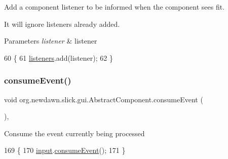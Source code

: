 Add a component listener to be informed when the component sees fit.

It will ignore listeners already added.


\begin{DoxyParams}{Parameters}
{\em listener} & listener \\
\hline
\end{DoxyParams}

\begin{DoxyCode}
60                                                         \{
61         \mbox{\hyperlink{classorg_1_1newdawn_1_1slick_1_1gui_1_1_abstract_component_a7cec595b9b830ed15376739af35a1492}{listeners}}.add(listener);
62     \}
\end{DoxyCode}
\mbox{\label{classorg_1_1newdawn_1_1slick_1_1gui_1_1_abstract_component_a76fb8b7de47e5ed6129010ad3d6e748d}} 
\subsubsection{\texorpdfstring{consume\+Event()}{consumeEvent()}}
{\footnotesize\ttfamily void org.\+newdawn.\+slick.\+gui.\+Abstract\+Component.\+consume\+Event (\begin{DoxyParamCaption}{ }\end{DoxyParamCaption})\hspace{0.3cm}{\ttfamily [inline]}, {\ttfamily [protected]}}

Consume the event currently being processed 
\begin{DoxyCode}
169                                   \{
170         \mbox{\hyperlink{classorg_1_1newdawn_1_1slick_1_1gui_1_1_abstract_component_a06d7d458d50451485923e23c7d9d2b60}{input}}.\mbox{\hyperlink{classorg_1_1newdawn_1_1slick_1_1_input_a03ef6ccfdd2aed8c0d25111b1d310a40}{consumeEvent}}();
171     \}
\end{DoxyCode}
\mbox{\label{classorg_1_1newdawn_1_1slick_1_1gui_1_1_abstract_component_aa0963ca601fb01163572a9b3e05afd00}} 

